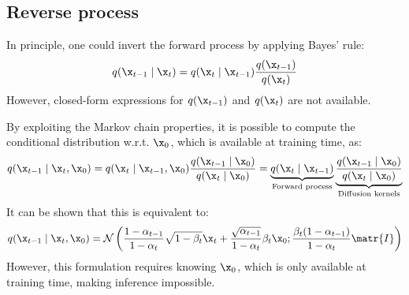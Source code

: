 \begin{description}
\end{description}


\subsection{Reverse process}

\begin{remark}
    In principle, one could invert the forward process by applying Bayes' rule:
    \[ q(\x_{t-1} \mid \x_t) = q(\x_t \mid \x_{t-1}) \frac{q(\x_{t-1})}{q(\x_t)} \]
    However, closed-form expressions for $q(\x_{t-1})$ and $q(\x_{t})$ are not available.

    By exploiting the Markov chain properties, it is possible to compute the conditional distribution w.r.t. $\x_0$, which is available at training time, as:
    \[ 
        q(\x_{t-1} \mid \x_t, \x_0) = 
        q(\x_t \mid \x_{t-1}, \x_0) \frac{q(\x_{t-1} \mid \x_0)}{q(\x_t \mid \x_0)} = 
        \underbrace{{q(\x_t \mid \x_{t-1})}}_{\text{Forward process}}
        \underbrace{\frac{q(\x_{t-1} \mid \x_0)}{q(\x_t \mid \x_0)}}_{\text{Diffusion kernels}}
    \]
    It can be shown that this is equivalent to:
    \[ q(\x_{t-1} \mid \x_t, \x_0) = \mathcal{N}\left( \frac{1-\alpha_{t-1}}{1-\alpha_t}\sqrt{1-\beta_t}\x_t + \frac{\sqrt{\alpha_{t-1}}}{1-\alpha_t}\beta_t \x_0; \frac{\beta_t(1-\alpha_{t-1})}{1-\alpha_t} \matr{I} \right) \]
    However, this formulation requires knowing $\x_0$, which is only available at training time, making inference impossible.
\end{remark}

